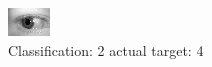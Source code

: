 \begin{figure}[h!]
\begin{center}
\includegraphics[width=0.60\columnwidth]{figures/ID777_class_2_target_4.png}
\end{center}
\caption{ Classification: 2 actual target: 4}
\label{fig:ID777_class_2_target_4}
\end{figure}
